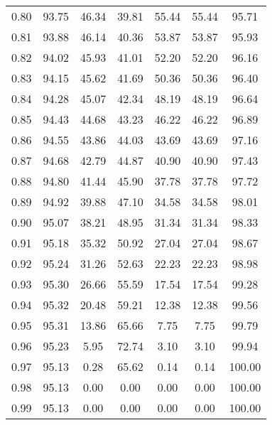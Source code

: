 \begin{tabular}{|c|c|c|c|c|c|c|}
      0.80 &     93.75 &     46.34 &      39.81 &   55.44 &      55.44 &         95.71 \\
      0.81 &     93.88 &     46.14 &      40.36 &   53.87 &      53.87 &         95.93 \\
      0.82 &     94.02 &     45.93 &      41.01 &   52.20 &      52.20 &         96.16 \\
      0.83 &     94.15 &     45.62 &      41.69 &   50.36 &      50.36 &         96.40 \\
      0.84 &     94.28 &     45.07 &      42.34 &   48.19 &      48.19 &         96.64 \\
      0.85 &     94.43 &     44.68 &      43.23 &   46.22 &      46.22 &         96.89 \\
      0.86 &     94.55 &     43.86 &      44.03 &   43.69 &      43.69 &         97.16 \\
      0.87 &     94.68 &     42.79 &      44.87 &   40.90 &      40.90 &         97.43 \\
      0.88 &     94.80 &     41.44 &      45.90 &   37.78 &      37.78 &         97.72 \\
      0.89 &     94.92 &     39.88 &      47.10 &   34.58 &      34.58 &         98.01 \\
      0.90 &     95.07 &     38.21 &      48.95 &   31.34 &      31.34 &         98.33 \\
      0.91 &     95.18 &     35.32 &      50.92 &   27.04 &      27.04 &         98.67 \\
      0.92 &     95.24 &     31.26 &      52.63 &   22.23 &      22.23 &         98.98 \\
      0.93 &     95.30 &     26.66 &      55.59 &   17.54 &      17.54 &         99.28 \\
      0.94 &     95.32 &     20.48 &      59.21 &   12.38 &      12.38 &         99.56 \\
      0.95 &     95.31 &     13.86 &      65.66 &    7.75 &       7.75 &         99.79 \\
      0.96 &     95.23 &      5.95 &      72.74 &    3.10 &       3.10 &         99.94 \\
      0.97 &     95.13 &      0.28 &      65.62 &    0.14 &       0.14 &        100.00 \\
      0.98 &     95.13 &      0.00 &       0.00 &    0.00 &       0.00 &        100.00 \\
      0.99 &     95.13 &      0.00 &       0.00 &    0.00 &       0.00 &        100.00 \\
\bottomrule
\end{tabular}
